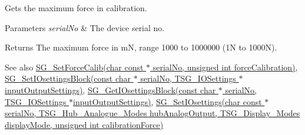 Gets the maximum force in calibration. 


\begin{DoxyParams}{Parameters}
{\em serial\+No} & The device serial no. \\
\hline
\end{DoxyParams}
\begin{DoxyReturn}{Returns}
The maximum force in mN, range 1000 to 1000000 (1N to 1000N). 
\end{DoxyReturn}
\begin{DoxySeeAlso}{See also}
\hyperlink{group___t_cube_strain_gauge_gab197b2a6f5b56759db00a8b4d258e3d5}{S\+G\+\_\+\+Set\+Force\+Calib(char const $\ast$ serial\+No, unsigned int force\+Calibration)}, \hyperlink{group___t_cube_strain_gauge_gaa4deca95b8a8df64164599d6ccbd0693}{S\+G\+\_\+\+Set\+I\+Osettings\+Block(const char $\ast$ serial\+No, T\+S\+G\+\_\+\+I\+O\+Settings $\ast$input\+Output\+Settings)}, \hyperlink{group___t_cube_strain_gauge_ga82272877fefa4a5531f563a190f8b1e3}{S\+G\+\_\+\+Get\+I\+Osettings\+Block(const char $\ast$ serial\+No, T\+S\+G\+\_\+\+I\+O\+Settings $\ast$input\+Output\+Settings)}, \hyperlink{group___t_cube_strain_gauge_gaf816bcf97699810c3ad2e31f28bf136e}{S\+G\+\_\+\+Set\+I\+Osettings(char const $\ast$ serial\+No, T\+S\+G\+\_\+\+Hub\+\_\+\+Analogue\+\_\+\+Modes hub\+Analog\+Output, T\+S\+G\+\_\+\+Display\+\_\+\+Modes display\+Mode, unsigned int calibration\+Force)}


\end{DoxySeeAlso}
